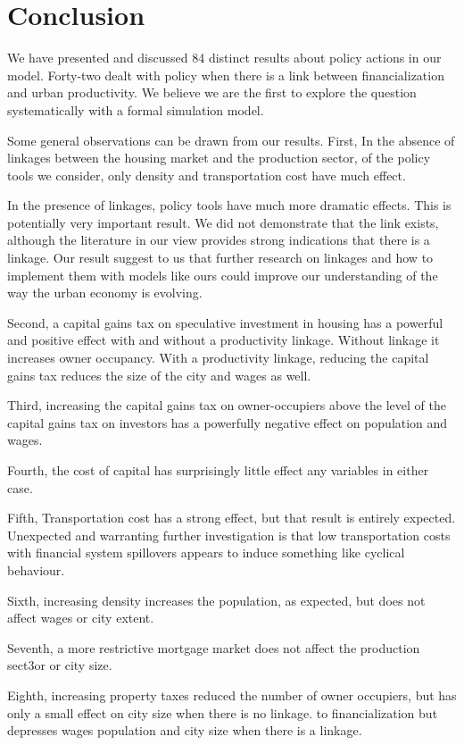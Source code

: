 \section{Conclusion}
We have presented and discussed 84 distinct results about policy actions in our model. Forty-two dealt with policy when there is a link between financialization and urban productivity. We believe we are the first to explore the question systematically with a formal simulation model.

Some general observations can be drawn from our results. First, In the absence of linkages between the housing market and the production sector, of the policy tools we consider, only density and transportation cost have much effect. 

In the presence of linkages, policy tools have much more dramatic effects. This is potentially very important result. 
We did not demonstrate that the link exists, although the literature in our view provides strong indications that there is a linkage.  Our result suggest to us that further research on linkages and how to implement them with models like ours could improve our understanding of the way the urban economy is evolving.   


Second, a capital gains tax on speculative investment in housing has a powerful and positive effect with and without a productivity linkage. Without linkage it increases owner occupancy. With a productivity linkage, reducing the capital gains tax reduces the size of the city and wages as well. 

Third, increasing the capital gains tax on owner-occupiers above the level of the capital gains tax on investors has a powerfully negative effect on population and wages.

Fourth, the cost of capital has surprisingly little effect any variables in  either case.

Fifth, Transportation cost has a strong effect, but that result is entirely expected. Unexpected and warranting further investigation is that low transportation costs with financial system spillovers appears to induce something like cyclical behaviour.

Sixth, increasing density increases the population, as expected, but does not affect wages or city extent.

Seventh, a more restrictive mortgage market does not affect the production sect3or or city size.

Eighth, increasing property taxes reduced the number of owner occupiers, but has only a small effect on city size when there is no linkage. to financialization but depresses wages population and city size when there is a linkage. 


